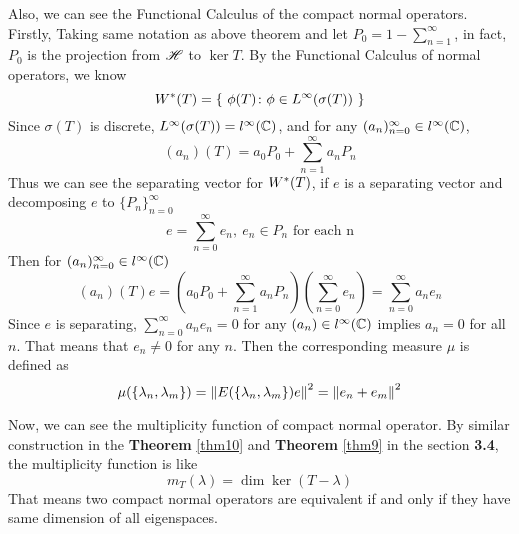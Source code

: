 \documentclass[a4paper,11pt]{report}
\begin{document}
Also, we can see the Functional Calculus of the compact normal operators. Firstly, Taking same notation as above theorem and let $P_0 = 1-\sum_{n=1}^{\infty}$, in fact, $P_0$ is the projection from $\mathscr{H}$ to $\ker{T}$. By the Functional Calculus of normal operators, we know
\begin{equation*}
	W^{*}(T) = \{~\phi(T) \colon \phi \in L^{\infty}(\sigma(T))~\}
\end{equation*}
Since $\sigma(T)$ is discrete, $L^{\infty}(\sigma(T)) = l^{\infty}(\mathbb{C})$, and for any $(a_n)_{n=0}^{\infty} \in l^{\infty}(\mathbb{C})$,
\begin{equation*}
	(a_n)(T) = a_0 P_0 + \sum_{n=1}^{\infty} a_n P_n
\end{equation*}
Thus we can see the separating vector for $W^{*}(T)$, if $e$ is a separating vector and decomposing $e$ to $\{P_n\}_{n=0}^{\infty}$
\begin{equation*}
	e = \sum_{n=0}^{\infty} e_n,~ e_n \in P_n \text{ for each n}
\end{equation*} 
Then for $(a_n)_{n=0}^{\infty} \in l^{\infty}(\mathbb{C})$
\begin{equation*}
	(a_n)(T)e = (a_0 P_0 + \sum_{n=1}^{\infty} a_n P_n)(\sum_{n=0}^{\infty} e_n) = \sum_{n=0}^{\infty} a_n e_n
\end{equation*}
Since $e$ is separating, $\sum_{n=0}^{\infty} a_n e_n = 0$ for any $(a_n) \in l^{\infty}(\mathbb{C})$ implies $a_n = 0$ for all $n$. That means that $e_n \neq 0$ for any $n$. Then the corresponding measure $\mu$ is defined as
\begin{equation*}
	\mu(\{\lambda_n,\lambda_m\}) = \left\lVert E(\{\lambda_n,\lambda_m\})e\right\lVert^2 = \left\lVert e_n+e_m\right\lVert^2
\end{equation*}

Now, we can see the multiplicity function of compact normal operator. By similar construction in the \textbf{Theorem} \ref{thm10} and \textbf{Theorem} \ref{thm9} in the section \textbf{3.4}, the multiplicity function is like
\begin{equation*}
	m_T(\lambda) = \dim{\ker{(T-\lambda)}}
\end{equation*}
That means two compact normal operators are equivalent if and only if they have same dimension of all eigenspaces.
\end{document}
